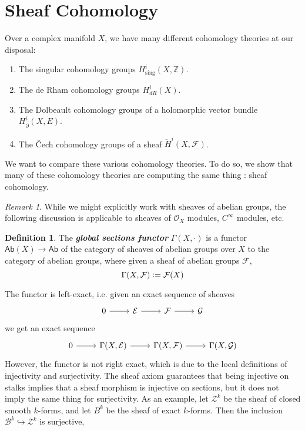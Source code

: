 \documentclass[psamsfonts, 12pt]{amsart}
\theoremstyle{definition}
\newtheorem{defn}[thm]{Definition}
\theoremstyle{remark}
\newtheorem*{rem*}{Remark}
\newcommand{\ib}[1]{\textbf{\textit{#1}}}
\newcommand{\Z}{\mathbb{Z}}
\newcommand{\dbar}{\overline{\partial}}
\newcommand{\defeq}{\vcentcolon=}
\begin{document}
\section{Sheaf Cohomology}
%
Over a complex manifold $X$, we have many different cohomology theories at our disposal:
\begin{enumerate}
  \item The singular cohomology groups $H^i_{\text{sing}}(X,\Z)$.
  \item The de Rham cohomology groups $H^i_{dR}(X)$.
  \item The Dolbeault cohomology groups of a holomorphic vector bundle
  $H^i_{\dbar}(X, E)$.
  \item The \v{C}ech cohomology groups of a sheaf $\check{H}^i(X,\mathcal{F})$.
\end{enumerate}
%
We want to compare these various cohomology theories. To do so, we show that many of
these cohomology theories are computing the same thing : sheaf cohomology.
%
\begin{rem*}
While we might explicitly work with sheaves of abelian groups, the following discussion
is applicable to sheaves of $\mathcal{O}_X$ modules, $C^\infty$ modules, etc.
\end{rem*}
%
\begin{defn}
The \ib{global sections functor} $\Gamma(X,\cdot)$ is a functor
$\mathsf{Ab}(X) \to \mathsf{Ab}$ of the category of sheaves of abelian groups over $X$ to
the category of abelian groups, where given a sheaf of abelian groups $\mathcal{F}$,
\[
\Gamma(X,\mathcal{F}) \defeq \mathcal{F}(X)
\]
\end{defn}
%
The functor is left-exact, i.e. given an exact sequence of sheaves
\[\begin{tikzcd}
0 \ar[r] & \mathcal{E} \ar[r] & \mathcal{F} \ar[r] & \mathcal{G}
\end{tikzcd}\]
we get an exact sequence
\[\begin{tikzcd}
0 \ar[r] & \Gamma(X,\mathcal{E}) \ar[r]
& \Gamma(X,\mathcal{F}) \ar[r] & \Gamma(X,\mathcal{G})
\end{tikzcd}\]
%
However, the functor is not right exact, which is due to the local definitions of
injectivity and surjectivity. The sheaf axiom guarantees that being injective on
stalks implies that a sheaf morphism is injective on sections, but it does not
imply the same thing for surjectivity. As an example, let $\mathcal{Z}^k$ be
the sheaf of closed smooth $k$-forms, and let $B^k$ be the sheaf of exact $k$-forms.
Then the inclusion $\mathcal{B}^k \hookrightarrow \mathcal{Z}^k$ is surjective,
\end{document}
